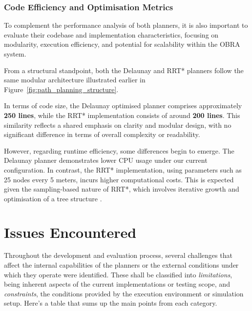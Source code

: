 \documentclass[a4paper,11pt]{report}
\begin{document}
\subsubsection*{Code Efficiency and Optimisation Metrics}

To complement the performance analysis of both planners, it is also important to evaluate their codebase and 
implementation characteristics, focusing on modularity, execution efficiency, and potential for scalability within the OBRA system.

From a structural standpoint, both the Delaunay and RRT* planners follow the same modular architecture illustrated earlier in 
Figure~\ref{fig:path_planning_structure}. 

In terms of code size, the Delaunay optimised planner comprises approximately \textbf{250 lines}, 
while the RRT* implementation consists of around \textbf{200 lines}. 
This similarity reflects a shared emphasis on clarity and modular design, with no significant difference in terms of overall complexity or readability. 

However, regarding runtime efficiency, some differences begin to emerge. The Delaunay planner demonstrates lower 
CPU usage under our current configuration. In contrast, the RRT* implementation, using parameters such as 25 nodes 
every 5 meters, incurs higher computational costs. This is expected given the sampling-based nature of RRT*, which involves 
iterative growth and optimisation of a tree structure \cite{reference3}.

\section{Issues Encountered}

Throughout the development and evaluation process, several challenges that affect the internal capabilities of the planners
or the external conditions under which they operate were identified.
These shall be classified into \textit{limitations}, being inherent aspects of the current implementations or testing scope, and
\textit{constraints}, the conditions provided by the execution environment or simulation setup.
Here's a table that sums up the main points from each category.
\end{document}
